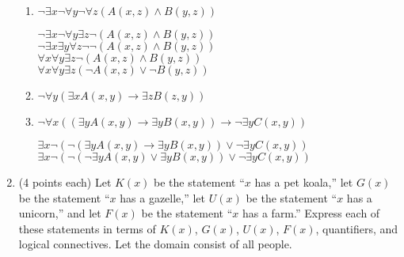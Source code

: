 \documentclass[11pt]{article}
\newcommand{\pte}[1]{\textcolor{maincolor}{(#1 points each)}}
\begin{document}
\begin{justify}
\begin{enumerate}
    \begin{enumerate}
        \item $\neg \exists x \neg \forall y \neg \forall z (A(x,z) \land B(y,z))$
        \begin{mdframed}
            $\neg \exists x \neg \forall y \exists z \neg (A(x, z) \land B(y, z))$ \\
            $\neg \exists x \exists y \forall z \neg \neg (A(x, z) \land B(y, z))$ \\
            $\forall x  \forall y \exists z \neg (A(x, z) \land B(y, z))$ \\
            $\forall x  \forall y \exists z (\neg A(x, z) \lor \neg B(y, z))$
        \end{mdframed}
        \item $\neg  \forall y (\exists x A(x,y) \rightarrow \exists z B(z,y))$
        \item $\neg \forall x((\exists y A(x,y) \rightarrow \exists y B(x,y)) \rightarrow \neg \exists y C(x,y))$
        \begin{mdframed}
            $ \exists x \neg (\neg (\exists y A(x, y) \rightarrow \exists y B(x,y)) \lor \neg \exists y C(x, y))$ \\
            $ \exists x \neg (\neg (\neg \exists y A(x,y) \lor \exists y B(x,y)) \lor \neg \exists y C(x, y))$ 
        \end{mdframed}
    \end{enumerate}

    \item \pte{4} Let $K(x)$ be the statement ``$x$ has a pet koala,'' let $G(x)$ be the statement ``$x$ has a gazelle,'' let $U(x)$ be the statement ``$x$ has a unicorn,'' and let $F(x)$ be the statement ``$x$ has a farm.'' Express each of these statements in terms of $K(x)$, $G(x)$, $U(x)$, $F(x)$, quantifiers, and logical connectives. Let the domain consist of all people.


\end{enumerate}
\end{justify}
\end{document}
